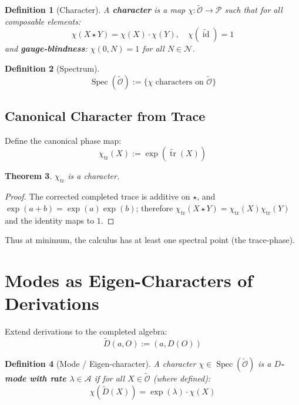 \documentclass[12pt, oneside]{article}
\newtheorem{theorem}{Theorem}[section]
\newtheorem{definition}[theorem]{Definition}
\DeclareMathOperator{\id}{id}
\DeclareMathOperator{\tr}{tr}
\DeclareMathOperator{\Spec}{Spec}
\newcommand{\N}{\mathcal{N}}
\newcommand{\A}{\mathcal{A}}
\newcommand{\Opr}{\mathcal{O}}
\begin{document}
\begin{definition}[Character]
A \textbf{character} is a map $\chi: \widetilde{\Opr} \rightarrow \mathcal{P}$ such that for all composable elements:
\begin{equation}
\chi(X \star Y) = \chi(X) \cdot \chi(Y), \quad \chi(\widetilde{\id}) = 1
\end{equation}
and \textbf{gauge-blindness}: $\chi(0, N) = 1$ for all $N \in \N$.
\end{definition}

\begin{definition}[Spectrum]
\begin{equation}
\Spec(\widetilde{\Opr}) := \{ \chi \text{ characters on } \widetilde{\Opr} \}
\end{equation}
\end{definition}

\subsection{Canonical Character from Trace}

Define the canonical phase map:
\begin{equation}
\chi_{\tr}(X) := \exp(\widetilde{\tr}(X))
\end{equation}

\begin{theorem}
$\chi_{\tr}$ is a character.
\end{theorem}
\begin{proof}
The corrected completed trace is additive on $\star$, and $\exp(a+b)=\exp(a)\exp(b)$; therefore $\chi_{\tr}(X\star Y)=\chi_{\tr}(X)\chi_{\tr}(Y)$ and the identity maps to $1$.
\end{proof}

Thus at minimum, the calculus has at least one spectral point (the trace-phase).

\section{Modes as Eigen-Characters of Derivations}

Extend derivations to the completed algebra:
\begin{equation}
\widetilde{D}(a, O) := (a, D(O))
\end{equation}

\begin{definition}[Mode / Eigen-character]
A character $\chi \in \Spec(\widetilde{\Opr})$ is a \textbf{$D$-mode with rate $\lambda \in \A$} if for all $X \in \widetilde{\Opr}$ (where defined):
\begin{equation}
\chi(\widetilde{D}(X)) = \exp(\lambda) \cdot \chi(X)
\end{equation}
\end{definition}
\end{document}
